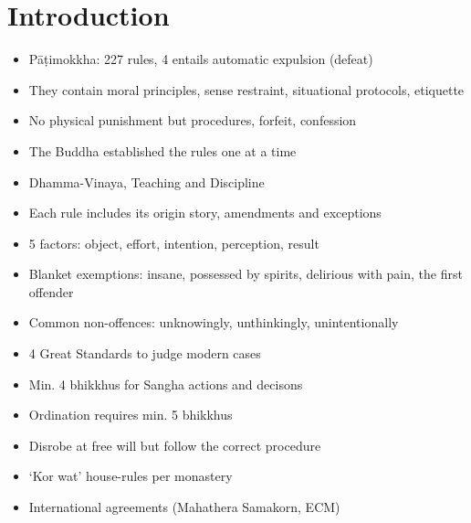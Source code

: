\chapter{Introduction}

\begin{itemize}
\tightlist
\item
  Pāṭimokkha: 227 rules, 4 entails automatic expulsion (defeat)
\item
  They contain moral principles, sense restraint, situational protocols,
  etiquette
\item
  No physical punishment but procedures, forfeit, confession
\item
  The Buddha established the rules one at a time
\item
  Dhamma-Vinaya, Teaching and Discipline
\item
  Each rule includes its origin story, amendments and exceptions
\item
  5 factors: object, effort, intention, perception, result
\item
  Blanket exemptions: insane, possessed by spirits, delirious with pain,
  the first offender
\item
  Common non-offences: unknowingly, unthinkingly, unintentionally
\item
  4 Great Standards to judge modern cases
\item
  Min. 4 bhikkhus for Sangha actions and decisons
\item
  Ordination requires min. 5 bhikkhus
\item
  Disrobe at free will but follow the correct procedure
\item
  `Kor wat' house-rules per monastery
\item
  International agreements (Mahathera Samakorn, ECM)
\end{itemize}

